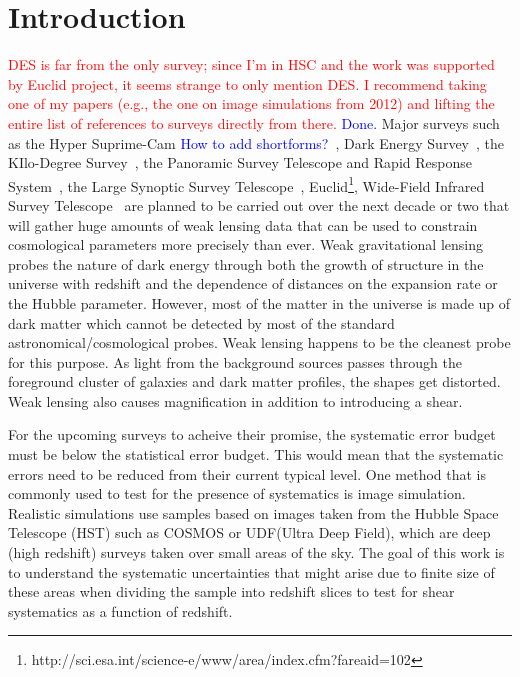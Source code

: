 \documentclass[twocolumn,useAMS,usenatbib]{mn2e}
\newcommand{\rachel}[1]{{\textcolor{red}{#1}}}
\newcommand{\arun}[1]{{\textcolor{blue}{#1}}}
\begin{document}
\section{Introduction}
\label{S:intro}

\rachel{DES is far from the only survey; since I'm in HSC and the work was supported by Euclid project, it seems strange to only mention DES.  I recommend taking one of my papers (e.g., the one on image simulations from 2012) and lifting the entire list of references to surveys directly from there.}
\arun{Done.}
Major surveys such as the Hyper Suprime-Cam \arun{How to add shortforms?}~\citep[HSC;][]{HSC_Overview}, Dark Energy Survey~\citep[DESC;][]{DESC}, the KIlo-Degree Survey~\citep[KIDS;][]{KIDS}, the Panoramic Survey Telescope and Rapid Response System~\citep[PanSTARRS;][]{PanSTARRS_2010},
the Large Synoptic Survey Telescope~\citep[LSST;][]{LSST_Book}, Euclid\footnote{http://sci.esa.int/science-e/www/area/index.cfm?fareaid=102}, Wide-Field Infrared Survey Telescope~\citep[WFIRST;][]{WFIRST_Final}
are planned to be carried out over the next decade or two that will gather huge amounts of weak lensing data that can be used to constrain cosmological parameters more precisely than ever.
Weak gravitational lensing probes the nature of dark energy through both the growth of structure in the universe with redshift and the dependence of distances on the expansion rate or the Hubble parameter.
However, most of the matter in the universe is made up of dark matter which cannot be detected by most of the standard astronomical/cosmological probes. Weak lensing happens to be the cleanest probe for this purpose.
As light from the background sources passes through the foreground cluster of galaxies and dark matter profiles, the shapes get distorted. Weak lensing also causes magnification in addition to introducing a shear.

For the upcoming surveys to acheive their promise, the systematic error budget must be below the statistical error budget. This would mean that the systematic errors need to be reduced from their current typical level.
One method that is commonly used to test for the presence of systematics is image simulation. Realistic simulations use samples based on images taken from the Hubble Space Telescope (HST) such as COSMOS or UDF(Ultra Deep Field), which are deep (high redshift) surveys taken over small areas of the sky.
The goal of this work is to understand the systematic uncertainties that might arise due to finite size of these areas when dividing the sample into redshift slices to test for 
shear systematics as a function of redshift.
\end{document}
